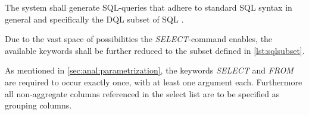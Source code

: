 The system shall generate SQL-queries that adhere to standard SQL syntax in general and specifically the \ac{DQL} subset of SQL \cite{iso_SQL_framework_pt2_2016, iso_SQL_framework_2016}.

Due to the vast space of possibilities the \textit{SELECT}-command enables, the available keywords shall be further reduced to the subset defined in \ref{lst:sqlsubset}.

As mentioned in \ref{sec:anal:parametrization}, the keywords \textit{SELECT} and \textit{FROM} are required to occur exactly once, with at least one argument each. Furthermore all non-aggregate columns referenced in the select list are to be specified as grouping columns.


